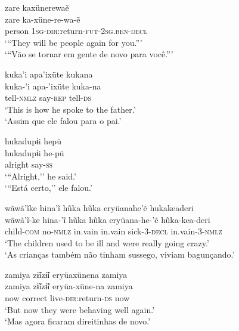\documentclass[output=paper,
modfonts,nonflat
]{langsci/langscibook}
\begin{document}
\ea   zare kaxünerewaẽ \\[.3em] 
\gll 	zare ka-xüne-re-wa-ẽ\\
person \textsc{1sg}-\textsc{dir:}return-\textsc{fut}-\textsc{2sg.ben}-\textsc{decl}\\                        
\glt  `{``}They will be people again for you.{''}' \\
`{``}Vão se tornar em gente de novo para você.{''}' \\
\z

\ea  kuka'i apa'ixüte kukana \\[.3em]
\gll 	kuka-'i apa-'ixüte kuka-na\\
tell-\textsc{nmlz} say-\textsc{rep} tell-\textsc{ds}\\
\glt  `This is how he spoke to the father.' \\
`Assim que ele falou para o pai.' \\ 
\z

\ea    hukadupɨi hepü \\[.3em]
\gll 	hukadupɨi he-pü\\
alright say-\textsc{ss}\\
\glt   `{``}Alright,'' he said.'\\
`{``}Está certo,'' ele falou.'\\
\z

\ea   wãwã'ĩke hina'ĩ hũka hũka eryüanahe'ẽ  hukakeaderi \\[.3em]
\gll 	 wãwã'ĩ-ke hina-'ĩ hũka hũka eryüana-he-'ẽ hũka-kea-deri\\
child-\textsc{com} no-\textsc{nmlz} in.vain in.vain sick-3-\textsc{decl} in.vain-\textsc{3-nmlz}\\
\glt    `The children used to be ill and were really going crazy.'\\
`As crianças também não tinham sussego, viviam bagunçando.'\\
\z

\ea     zamiya zɨ̃izɨ̃i eryüaxünena zamiya \\[.3em]
\gll 	zamiya zɨ̃izɨ̃i eryüa-xüne-na zamiya\\
now correct live-\textsc{dir:}return-\textsc{ds} now \\
\glt    `But now they were behaving well again.' \\
`Mas agora ficaram direitinhas de novo.' \\
\z
\end{document}
